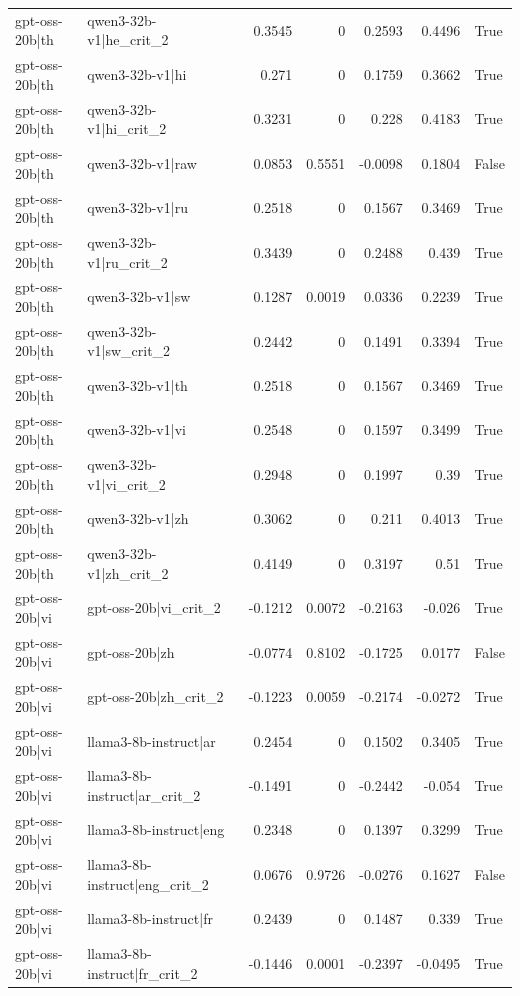 \begin{table}
\begin{tabular}{l l r r r r l}
gpt-oss-20b|th & qwen3-32b-v1|he_crit_2 & 0.3545 & 0 & 0.2593 & 0.4496 & True \\
gpt-oss-20b|th & qwen3-32b-v1|hi & 0.271 & 0 & 0.1759 & 0.3662 & True \\
gpt-oss-20b|th & qwen3-32b-v1|hi_crit_2 & 0.3231 & 0 & 0.228 & 0.4183 & True \\
gpt-oss-20b|th & qwen3-32b-v1|raw & 0.0853 & 0.5551 & -0.0098 & 0.1804 & False \\
gpt-oss-20b|th & qwen3-32b-v1|ru & 0.2518 & 0 & 0.1567 & 0.3469 & True \\
gpt-oss-20b|th & qwen3-32b-v1|ru_crit_2 & 0.3439 & 0 & 0.2488 & 0.439 & True \\
gpt-oss-20b|th & qwen3-32b-v1|sw & 0.1287 & 0.0019 & 0.0336 & 0.2239 & True \\
gpt-oss-20b|th & qwen3-32b-v1|sw_crit_2 & 0.2442 & 0 & 0.1491 & 0.3394 & True \\
gpt-oss-20b|th & qwen3-32b-v1|th & 0.2518 & 0 & 0.1567 & 0.3469 & True \\
gpt-oss-20b|th & qwen3-32b-v1|vi & 0.2548 & 0 & 0.1597 & 0.3499 & True \\
gpt-oss-20b|th & qwen3-32b-v1|vi_crit_2 & 0.2948 & 0 & 0.1997 & 0.39 & True \\
gpt-oss-20b|th & qwen3-32b-v1|zh & 0.3062 & 0 & 0.211 & 0.4013 & True \\
gpt-oss-20b|th & qwen3-32b-v1|zh_crit_2 & 0.4149 & 0 & 0.3197 & 0.51 & True \\
gpt-oss-20b|vi & gpt-oss-20b|vi_crit_2 & -0.1212 & 0.0072 & -0.2163 & -0.026 & True \\
gpt-oss-20b|vi & gpt-oss-20b|zh & -0.0774 & 0.8102 & -0.1725 & 0.0177 & False \\
gpt-oss-20b|vi & gpt-oss-20b|zh_crit_2 & -0.1223 & 0.0059 & -0.2174 & -0.0272 & True \\
gpt-oss-20b|vi & llama3-8b-instruct|ar & 0.2454 & 0 & 0.1502 & 0.3405 & True \\
gpt-oss-20b|vi & llama3-8b-instruct|ar_crit_2 & -0.1491 & 0 & -0.2442 & -0.054 & True \\
gpt-oss-20b|vi & llama3-8b-instruct|eng & 0.2348 & 0 & 0.1397 & 0.3299 & True \\
gpt-oss-20b|vi & llama3-8b-instruct|eng_crit_2 & 0.0676 & 0.9726 & -0.0276 & 0.1627 & False \\
gpt-oss-20b|vi & llama3-8b-instruct|fr & 0.2439 & 0 & 0.1487 & 0.339 & True \\
gpt-oss-20b|vi & llama3-8b-instruct|fr_crit_2 & -0.1446 & 0.0001 & -0.2397 & -0.0495 & True \\

\end{tabular}
\end{table}
